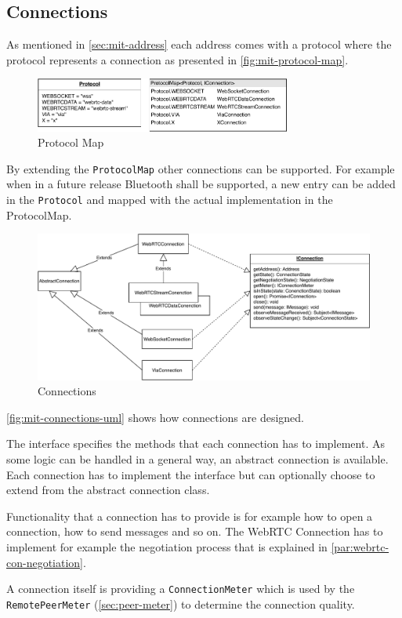 \subsection{Connections}
As mentioned in \vref{sec:mit-address} each address comes with a protocol where the protocol represents a connection as presented in \vref{fig:mit-protocol-map}.

\begin{figure}[htb!]
\centering
\includegraphics[width=0.75\textwidth]{graphics/implementation/mitosis-architecture-connections-protocol-map.pdf}
\caption{Protocol Map}
\label{fig:mit-protocol-map}
\end{figure}

By extending the \lstinline|ProtocolMap| other connections can be supported. For example when in a future release Bluetooth shall be supported, a new entry can be added in the \lstinline|Protocol| and mapped with the actual implementation in the ProtocolMap.

\begin{figure}[htb!]
\centering
\includegraphics[width=1\textwidth]{graphics/implementation/mitosis-architecture-connections.pdf}
\caption{Connections}\label{sec:mit-connections}
\label{fig:mit-connections-uml}
\end{figure}

\vref{fig:mit-connections-uml} shows how connections are designed.

The interface specifies the methods that each connection has to implement. As some logic can be handled in a general way, an abstract connection is available. Each connection has to implement the interface but can optionally choose to extend from the abstract connection class.

Functionality that a connection has to provide is for example how to open a connection, how to send messages and so on. The WebRTC Connection has to implement for example the negotiation process that is explained in \vref{par:webrtc-con-negotiation}.

A connection itself is providing a \lstinline|ConnectionMeter| which is used by the \lstinline|RemotePeerMeter| (\vref{sec:peer-meter}) to determine the connection quality.